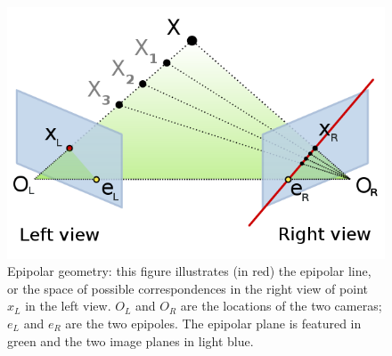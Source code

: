 \documentclass[12pt,a4paper,twoside,openright]{report}
\begin{document}
\begin{figure}
\begin{center}	
\includegraphics[scale=0.7]{figs/Epipolar_geometry.png}
\caption{Epipolar geometry: this figure illustrates (in red) the epipolar line, or the space of possible correspondences in the right view of point $x_{L}$ in the left view. $O_{L}$ and $O_{R}$ are the locations of the two cameras; $e_{L}$ and $e_{R}$ are the two epipoles. The epipolar plane is featured in green and the two image planes in light blue.}
\end{center}
\end{figure}
 
\end{document}
